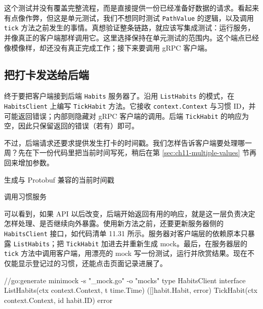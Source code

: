 这个测试并没有覆盖完整流程，而是直接提供一份已经准备好数据的请求。看起来有点像作弊，但这是单元测试，我们不想同时测试 \texttt{PathValue} 的逻辑，以及调用 \texttt{tick} 方法之前发生的事情。真想验证整条链路，就应该写集成测试：运行服务，并像真正的客户端那样调用它。这里选择保持在单元测试的范围内。这个端点已经像模像样，却还没有真正完成工作；接下来要调用 gRPC 客户端。

\subsection{把打卡发送给后端}

终于要把客户端接到后端 \texttt{Habits} 服务器了。沿用 \texttt{ListHabits} 的模式，在 \texttt{HabitsClient} 上编写 \texttt{TickHabit} 方法。它接收 \texttt{context.Context} 与习惯 ID，并可能返回错误；内部则隐藏对 gRPC 客户端的调用。后端 \texttt{TickHabit} 的响应为空，因此只保留返回的错误（若有）即可。

不过，后端请求还要求提供发生打卡的时间戳。我们怎样告诉客户端要处理哪一周？先在下一份代码里把当前时间写死，稍后在第 \ref{sec:ch11-multiple-values} 节再回来增加参数。


\begin{codeannotations}
\item 生成与 Protobuf 兼容的当前时间戳
\item 调用习惯服务
\end{codeannotations}

可以看到，如果 API 以后改变，后端开始返回有用的响应，就是这一层负责决定怎样处理、是否继续向外暴露。使用新方法之前，还要更新服务器侧的 \texttt{HabitsClient} 接口，如代码清单 11.31 所示。服务器对客户端层的依赖原本只暴露 \texttt{ListHabits}；把 \texttt{TickHabit} 加进去并重新生成 mock。最后，在服务器层的 \texttt{tick} 方法中调用客户端，用漂亮的 mock 写一份测试，运行并欣赏结果。现在不仅能显示登记过的习惯，还能点击页面记录进展了。

\begin{gocode}[title={代码清单 11.31 \texttt{server.go}：在接口中加入 \texttt{TickHabit}}]
//go:generate minimock -s "_mock.go" -o "mocks"
type HabitsClient interface {
    ListHabits(ctx context.Context,
        t time.Time) ([]habit.Habit, error)
    TickHabit(ctx context.Context, id habit.ID) error
}
\end{gocode}

